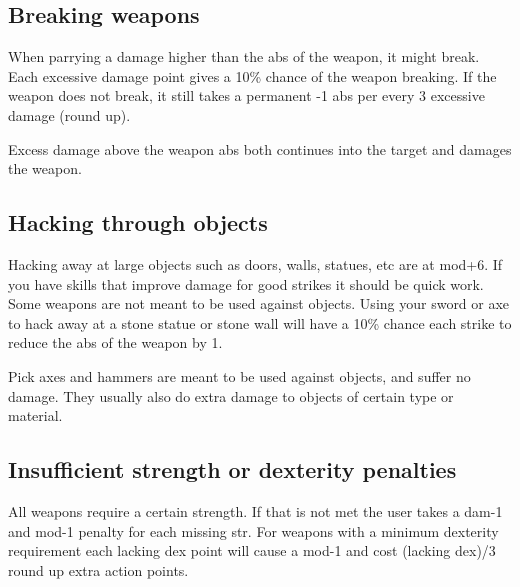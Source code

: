 \subsection*{Breaking weapons}
When parrying a damage higher than the abs of the weapon, it might break.
Each excessive damage point gives a 10\% chance of the weapon breaking.
If the weapon does not break, it still takes a permanent -1 abs per every 3 excessive damage (round up).

Excess damage above the weapon abs both continues into the target and damages the weapon.


%


\subsection*{Hacking through objects}
Hacking away at large objects such as doors, walls, statues, etc are at mod+6. If you have skills that improve damage for good strikes it should be quick work.
Some weapons are not meant to be used against objects. Using your sword or axe to hack away at a stone statue or stone wall will have a 10\% chance each strike to reduce the abs of the weapon by 1.

Pick axes and hammers are meant to be used against objects, and suffer no damage. They usually also do extra damage to objects of certain type or material.


\subsection*{Insufficient strength or dexterity penalties}
All weapons require a certain strength. If that is not met the user takes a dam-1 and mod-1 penalty for each missing str. For weapons with a minimum dexterity requirement each lacking dex point will cause a mod-1 and cost (lacking dex)/3 round up extra action points.

